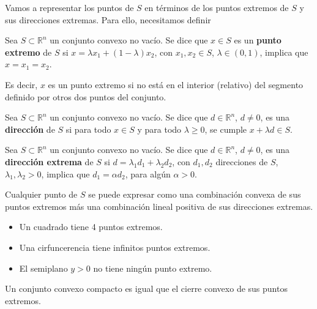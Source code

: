 Vamos a representar los puntos de $S$ en términos de los puntos extremos de $S$ y sus direcciones extremas. Para ello, necesitamos definir 

\begin{defn}
Sea $S\subset\mathbb{R}^n$ un conjunto convexo no vacío. Se dice que $x\in S$ es un \textbf{punto extremo} de $S$ si $x=\lambda x_1 + (1-\lambda) x_2$, con $x_1,x_2\in S$, $\lambda\in (0,1)$, implica que $x=x_1=x_2$.
\end{defn}

Es decir, $x$ es un punto extremo si no está en el interior (relativo) del segmento definido por otros dos puntos del conjunto.


\begin{defn}
Sea $S\subset\mathbb{R}^n$ un conjunto convexo no vacío. Se dice que $d\in \mathbb{R}^n$, $d\neq 0$, es una \textbf{dirección} de $S$ si para todo $x\in S$ y para todo $\lambda\geq 0$, se cumple $x + \lambda d \in S$. 
\end{defn}

\begin{defn}
Sea $S\subset\mathbb{R}^n$ un conjunto convexo no vacío. Se dice que $d\in \mathbb{R}^n$, $d\neq 0$, es una \textbf{dirección extrema } de $S$ si $d=\lambda_1 d_1 + \lambda_2 d_2$, con $d_1,d_2$ direcciones de $S$, $\lambda_1,\lambda_2 > 0$, implica que $d_1= \alpha d_2$, para algún $\alpha>0$.
\end{defn}

\obs 

\begin{prop}
Cualquier punto de $S$ se puede expresar como una combinación convexa de sus puntos extremos más una combinación lineal positiva de sus direcciones extremas.
\end{prop}

\begin{example}
\begin{itemize}
	\item Un cuadrado tiene 4 puntos extremos.
	\item Una cirfuncerencia tiene infinitos puntos extremos.
	\item El semiplano $y>0$ no tiene ningún punto extremo.
\end{itemize}
\end{example}


\begin{prop}
Un conjunto convexo compacto es igual que el cierre convexo de sus puntos extremos.
\end{prop}

